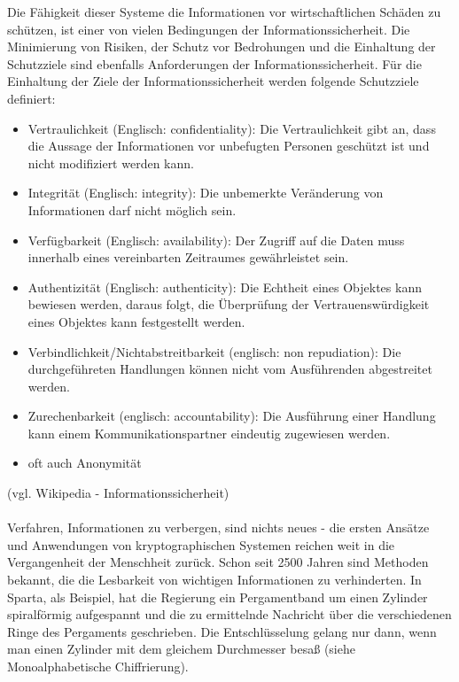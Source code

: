\documentclass[12pt,a4paper]{report}
\begin{document}
\begin{onehalfspace}
Die Fähigkeit dieser Systeme die Informationen vor wirtschaftlichen Schäden zu schützen, ist einer von vielen Bedingungen der Informationssicherheit. Die Minimierung von Risiken, der Schutz vor Bedrohungen und die Einhaltung der Schutzziele sind ebenfalls Anforderungen der Informationssicherheit. Für die Einhaltung der Ziele der Informationssicherheit werden folgende Schutzziele definiert:

\begin{itemize}
\item Vertraulichkeit (Englisch: confidentiality): Die Vertraulichkeit gibt an, dass die Aussage der Informationen vor unbefugten Personen geschützt ist und nicht modifiziert werden kann.
\item Integrität (Englisch: integrity): Die unbemerkte Veränderung von Informationen darf nicht möglich sein.
\item Verfügbarkeit (Englisch: availability): Der Zugriff auf die Daten muss innerhalb eines vereinbarten Zeitraumes gewährleistet sein.
\item Authentizität (Englisch: authenticity): Die Echtheit eines Objektes kann bewiesen werden, daraus folgt, die Überprüfung der Vertrauenswürdigkeit eines Objektes kann festgestellt werden.
\item Verbindlichkeit/Nichtabstreitbarkeit (englisch: non repudiation): Die durchgeführeten Handlungen können nicht vom Ausführenden abgestreitet werden.
\item Zurechenbarkeit (englisch: accountability): Die Ausführung einer Handlung kann einem Kommunikationspartner eindeutig zugewiesen werden.
\item oft auch Anonymität
\end{itemize}

(vgl. Wikipedia - Informationssicherheit)\\\\

Verfahren, Informationen zu verbergen, sind nichts neues - die ersten Ansätze und Anwendungen von kryptographischen Systemen reichen weit in die Vergangenheit der Menschheit zurück. Schon seit 2500 Jahren sind Methoden bekannt, die die Lesbarkeit von wichtigen Informationen zu verhinderten. In Sparta, als Beispiel, hat die Regierung ein Pergamentband um einen Zylinder spiralförmig aufgespannt und die zu ermittelnde Nachricht über die verschiedenen Ringe des Pergaments geschrieben. Die Entschlüsselung gelang nur dann, wenn man einen Zylinder mit dem gleichem Durchmesser besaß (siehe Monoalphabetische Chiffrierung).\\


\end{onehalfspace}
\end{document}
